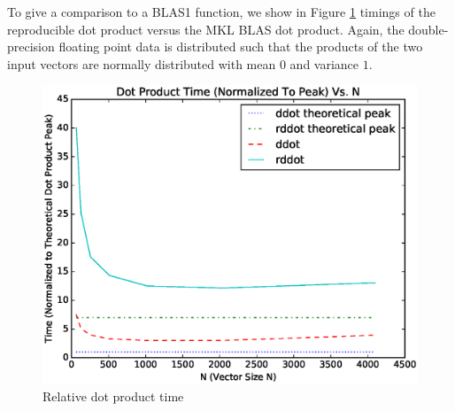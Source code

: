     To give a comparison to a BLAS1 function, we show in Figure \ref{fig:dot_timings} timings of the reproducible dot product versus the MKL BLAS dot product. Again, the double-precision floating point data is distributed such that the products of the two input vectors are normally distributed with mean $0$ and variance $1$.
  \begin{figure}[H]
  \begin{center}
  \includegraphics[width=\textwidth]{plots/dot_comparison}
  \caption{Relative dot product time}
  \label{fig:dot_timings}
  \end{center}
  \end{figure}

